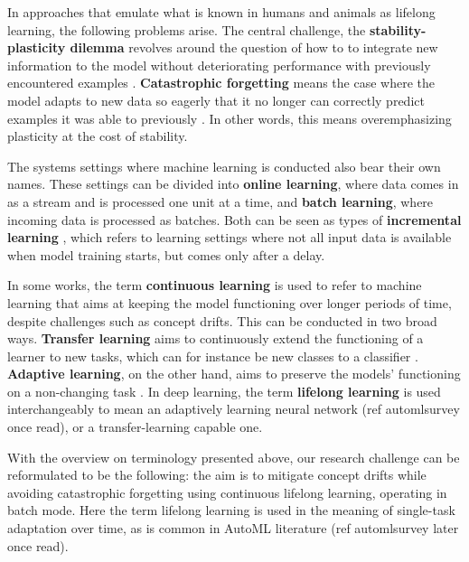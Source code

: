 In approaches that emulate what is known in humans and animals as lifelong learning, the following problems arise. The central challenge, the \textbf{stability-plasticity dilemma} revolves around the question of how to to integrate new information to the model without deteriorating performance with previously encountered examples \cite{lmlinneuralnets}. \textbf{Catastrophic forgetting} means the case where the model adapts to new data so eagerly that it no longer can correctly predict examples it was able to previously \cite{lmlinneuralnets}. In other words, this means overemphasizing plasticity at the cost of stability.

The systems settings where machine learning is conducted also bear their own names. These settings can be divided into \textbf{online learning}, where data comes in as a stream and is processed one unit at a time, and \textbf{batch learning}, where incoming data is processed as batches. Both can be seen as types of \textbf{incremental learning} \cite{giraud-carrier_note_2000}, which refers to learning settings where not all input data is available when model training starts, but comes only after a delay.

In some works, the term \textbf{continuous learning} is used to refer to machine learning that aims at keeping the model functioning over longer periods of time, despite challenges such as concept drifts. This can be conducted in two broad ways. \textbf{Transfer learning} aims to continuously extend the functioning of a learner to new tasks, which can for instance be new classes to a classifier \cite{iotsurvey}. \textbf{Adaptive learning}, on the other hand, aims to preserve the models' functioning on a non-changing task \cite{conceptdriftsurvey}. In deep learning, the term \textbf{lifelong learning} is used interchangeably to mean an adaptively learning neural network (ref automlsurvey once read), or a transfer-learning capable one.

With the overview on terminology presented above, our research challenge can be reformulated to be the following: the aim is to mitigate concept drifts while avoiding catastrophic forgetting using continuous lifelong learning, operating in batch mode. Here the term lifelong learning is used in the meaning of single-task adaptation over time, as is common in AutoML literature (ref automlsurvey later once read).




